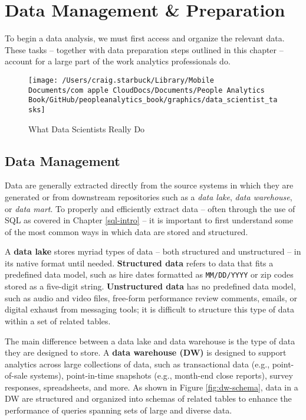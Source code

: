 \documentclass[
]{book}
\begin{document}
\hypertarget{data-mgmt-prep}{%
\chapter{Data Management \& Preparation}\label{data-mgmt-prep}}

To begin a data analysis, we must first access and organize the relevant data. These tasks -- together with data preparation steps outlined in this chapter -- account for a large part of the work analytics professionals do.

\begin{figure}

{\centering \texttt{[image: /Users/craig.starbuck/Library/Mobile Documents/com~apple~CloudDocs/Documents/People Analytics Book/GitHub/peopleanalytics\_book/graphics/data\_scientist\_tasks]} 

}

\caption{What Data Scientists Really Do}\label{fig:ds-tasks}
\end{figure}

\hypertarget{data-management}{%
\section{Data Management}\label{data-management}}

Data are generally extracted directly from the source systems in which they are generated or from downstream repositories such as a \emph{data lake}, \emph{data warehouse}, or \emph{data mart}. To properly and efficiently extract data -- often through the use of SQL as covered in Chapter \ref{sql-intro} -- it is important to first understand some of the most common ways in which data are stored and structured.

A \textbf{data lake} stores myriad types of data -- both structured and unstructured -- in its native format until needed. \textbf{Structured data} refers to data that fits a predefined data model, such as hire dates formatted as \texttt{MM/DD/YYYY} or zip codes stored as a five-digit string. \textbf{Unstructured data} has no predefined data model, such as audio and video files, free-form performance review comments, emails, or digital exhaust from messaging tools; it is difficult to structure this type of data within a set of related tables.

The main difference between a data lake and data warehouse is the type of data they are designed to store. A \textbf{data warehouse (DW)} is designed to support analytics across large collections of data, such as transactional data (e.g., point-of-sale systems), point-in-time snapshots (e.g., month-end close reports), survey responses, spreadsheets, and more. As shown in Figure \ref{fig:dw-schema}, data in a DW are structured and organized into schemas of related tables to enhance the performance of queries spanning sets of large and diverse data.
\end{document}
